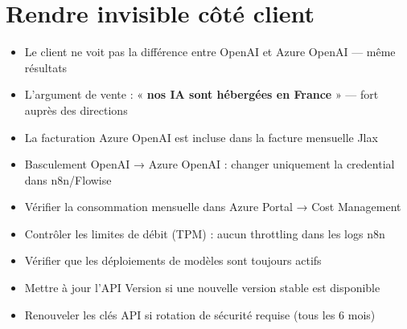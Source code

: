 \documentclass[11pt, a4paper]{article}
\begin{document}
\section{Rendre invisible côté client}

\begin{itemize}
  \item Le client ne voit pas la différence entre OpenAI et Azure OpenAI — même résultats
  \item L'argument de vente : « \textbf{nos IA sont hébergées en France} » — fort auprès des directions
  \item La facturation Azure OpenAI est incluse dans la facture mensuelle Jlax
  \item Basculement OpenAI → Azure OpenAI : changer uniquement la credential dans n8n/Flowise
\end{itemize}

\begin{checklist}
  \begin{itemize}
    \item[$\square$] Vérifier la consommation mensuelle dans Azure Portal → Cost Management
    \item[$\square$] Contrôler les limites de débit (TPM) : aucun throttling dans les logs n8n
    \item[$\square$] Vérifier que les déploiements de modèles sont toujours actifs
    \item[$\square$] Mettre à jour l'API Version si une nouvelle version stable est disponible
    \item[$\square$] Renouveler les clés API si rotation de sécurité requise (tous les 6 mois)
  \end{itemize}
\end{checklist}
\end{document}
